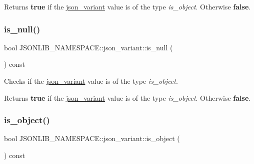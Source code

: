 \begin{DoxyReturn}{Returns}
{\bfseries true} if the \hyperlink{classJSONLIB__NAMESPACE_1_1json__variant}{json\+\_\+variant} value is of the type {\itshape is\+\_\+object}. Otherwise {\bfseries false}. 
\end{DoxyReturn}
\mbox{\label{classJSONLIB__NAMESPACE_1_1json__variant_abe8f66e81c598b6a9109a65e6844c5b5}} 
\subsubsection{\texorpdfstring{is\+\_\+null()}{is\_null()}\hspace{0.1cm}{\footnotesize\ttfamily [2/2]}}
{\footnotesize\ttfamily bool J\+S\+O\+N\+L\+I\+B\+\_\+\+N\+A\+M\+E\+S\+P\+A\+C\+E\+::json\+\_\+variant\+::is\+\_\+null (\begin{DoxyParamCaption}{ }\end{DoxyParamCaption}) const}



Checks if the \hyperlink{classJSONLIB__NAMESPACE_1_1json__variant}{json\+\_\+variant} value is of the type {\itshape is\+\_\+object}. 

\begin{DoxyReturn}{Returns}
{\bfseries true} if the \hyperlink{classJSONLIB__NAMESPACE_1_1json__variant}{json\+\_\+variant} value is of the type {\itshape is\+\_\+object}. Otherwise {\bfseries false}. 
\end{DoxyReturn}
\mbox{\label{classJSONLIB__NAMESPACE_1_1json__variant_a28b4156626bd9f0e344ba1704c7590f3}} 
\subsubsection{\texorpdfstring{is\+\_\+object()}{is\_object()}\hspace{0.1cm}{\footnotesize\ttfamily [1/2]}}
{\footnotesize\ttfamily bool J\+S\+O\+N\+L\+I\+B\+\_\+\+N\+A\+M\+E\+S\+P\+A\+C\+E\+::json\+\_\+variant\+::is\+\_\+object (\begin{DoxyParamCaption}{ }\end{DoxyParamCaption}) const}



